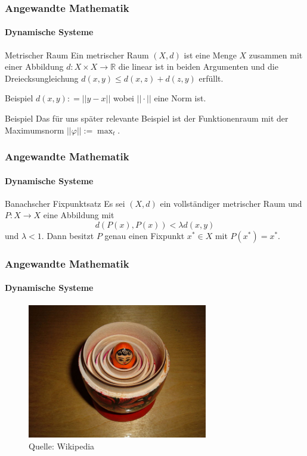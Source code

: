 \documentclass{beamer}
\begin{document}
\begin{frame}
    \frametitle{Angewandte Mathematik}
\framesubtitle{Dynamische Systeme }
\begin{block}{Metrischer Raum}
Ein metrischer Raum $(X,d)$ ist eine Menge $X$ zusammen mit einer Abbildung $d : X \times X \to \mathbb{R}$ die linear ist in beiden Argumenten und die Dreiecksungleichung $d(x,y) \leq d(x,z) + d(z,y)$ erfüllt.  
\end{block}
\begin{block}{Beispiel}
$d(x,y) : = || y- x  ||$  wobei $||  \cdot ||$  eine Norm ist. 
\end{block}

\begin{block}{Beispiel}
Das für uns später relevante Beispiel ist der Funktionenraum mit der Maximumsnorm $|| \varphi || := \max_t$.
\end{block}
 \end{frame}


\begin{frame}
    \frametitle{Angewandte Mathematik}
\framesubtitle{Dynamische Systeme }
\begin{block}{Banachscher Fixpunktsatz}
Es sei $(X,d)$ ein vollständiger metrischer Raum und $P: X \to X$ eine Abbildung mit $$d(P(x), P(x)) < \lambda d(x,y)$$ und $\lambda < 1$. Dann besitzt $P$ genau einen Fixpunkt $x^* \in X$ mit $P(x^*) = x^*$.

\end{block}

 \end{frame}

\begin{frame}
    \frametitle{Angewandte Mathematik}
\framesubtitle{Dynamische Systeme }
\begin{figure}[H]
      \centering
    \includegraphics[width=0.7\textwidth]{images/640px-Floral_matryoshka_set_2_smallest_doll_nested.JPG}
\caption{Quelle: Wikipedia}
\end{figure}

 \end{frame}
\end{document}
